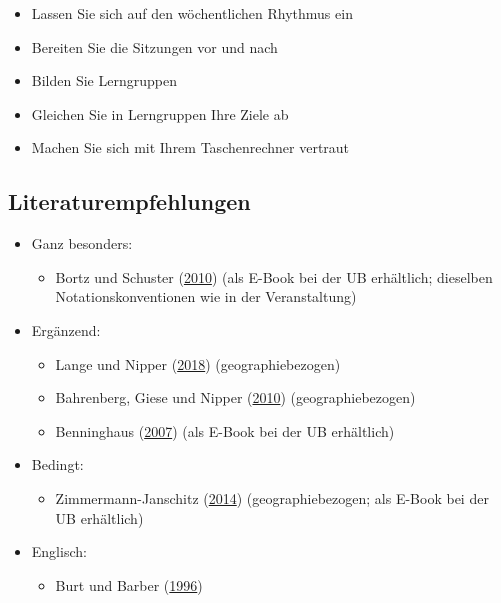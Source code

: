 \documentclass[
  11pt,
  ngerman,
  a4paper,
]{report}
\providecommand{\tightlist}{%
  \setlength{\itemsep}{0pt}\setlength{\parskip}{0pt}}
\begin{document}
\begin{itemize}
\tightlist
\item
  Lassen Sie sich auf den wöchentlichen Rhythmus ein
\item
  Bereiten Sie die Sitzungen vor und nach
\item
  Bilden Sie Lerngruppen
\item
  Gleichen Sie in Lerngruppen Ihre Ziele ab
\item
  Machen Sie sich mit Ihrem Taschenrechner vertraut
\end{itemize}

\hypertarget{literaturempfehlungen}{%
\subsection*{Literaturempfehlungen}\label{literaturempfehlungen}}

\begin{itemize}
\tightlist
\item
  Ganz besonders:

  \begin{itemize}
  \tightlist
  \item
    Bortz und Schuster (\protect\hyperlink{ref-bortz}{2010}) (als E-Book bei der UB erhältlich; dieselben Notationskonventionen wie in der Veranstaltung)
  \end{itemize}
\item
  Ergänzend:

  \begin{itemize}
  \tightlist
  \item
    Lange und Nipper (\protect\hyperlink{ref-delange}{2018}) (geographiebezogen)
  \item
    Bahrenberg, Giese und Nipper (\protect\hyperlink{ref-bahrenberg}{2010}) (geographiebezogen)
  \item
    Benninghaus (\protect\hyperlink{ref-benninghaus}{2007}) (als E-Book bei der UB erhältlich)
  \end{itemize}
\item
  Bedingt:

  \begin{itemize}
  \tightlist
  \item
    Zimmermann-Janschitz (\protect\hyperlink{ref-zimmermann-janschitz2014a}{2014}) (geographiebezogen; als E-Book bei der UB erhältlich)
  \end{itemize}
\item
  Englisch:

  \begin{itemize}
  \tightlist
  \item
    Burt und Barber (\protect\hyperlink{ref-burt}{1996})
  \end{itemize}
\end{itemize}
\end{document}
